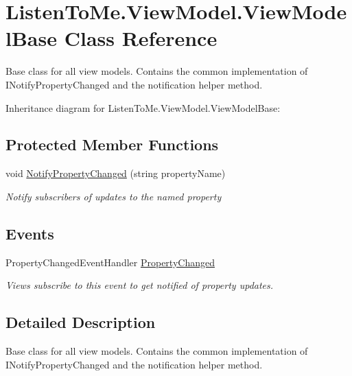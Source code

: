 \hypertarget{class_listen_to_me_1_1_view_model_1_1_view_model_base}{}\section{Listen\+To\+Me.\+View\+Model.\+View\+Model\+Base Class Reference}
\label{class_listen_to_me_1_1_view_model_1_1_view_model_base}


Base class for all view models. Contains the common implementation of I\+Notify\+Property\+Changed and the notification helper method.  




Inheritance diagram for Listen\+To\+Me.\+View\+Model.\+View\+Model\+Base\+:
\subsection*{Protected Member Functions}
\begin{DoxyCompactItemize}
\item 
void \mbox{\hyperlink{class_listen_to_me_1_1_view_model_1_1_view_model_base_a6b89260bf9d20007189f49a73dec334d}{Notify\+Property\+Changed}} (string property\+Name)
\begin{DoxyCompactList}\small\item\em Notify subscribers of updates to the named property \end{DoxyCompactList}\end{DoxyCompactItemize}
\subsection*{Events}
\begin{DoxyCompactItemize}
\item 
Property\+Changed\+Event\+Handler \mbox{\hyperlink{class_listen_to_me_1_1_view_model_1_1_view_model_base_ae448ae2d936921e058563627fae0292b}{Property\+Changed}}
\begin{DoxyCompactList}\small\item\em Views subscribe to this event to get notified of property updates. \end{DoxyCompactList}\end{DoxyCompactItemize}


\subsection{Detailed Description}
Base class for all view models. Contains the common implementation of I\+Notify\+Property\+Changed and the notification helper method. 




